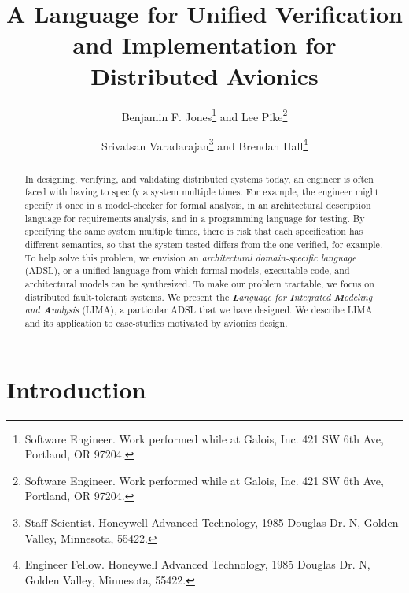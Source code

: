 \documentclass{AIAA}
\newcommand{\lee}[1]{ } %
\newcommand{\lee}[1]{ {\color{blue}$<$lee: #1$>$} } %
\begin{document}
\title{A Language for Unified Verification and Implementation for Distributed Avionics}

\author{Benjamin F. Jones\footnote{Software Engineer. Work performed while at Galois, Inc. 421 SW 6th Ave, Portland, OR 97204.} and Lee Pike\footnote{Software Engineer. Work performed while at Galois, Inc. 421 SW 6th Ave, Portland, OR 97204.}}
\author{Srivatsan Varadarajan\footnote{Staff Scientist. Honeywell Advanced Technology, 1985 Douglas Dr. N, Golden Valley, Minnesota, 55422.} and Brendan Hall\footnote{Engineer Fellow. Honeywell Advanced Technology, 1985 Douglas Dr. N, Golden Valley, Minnesota, 55422.}} 

\begin{abstract}
In designing, verifying, and validating distributed systems today, an engineer is often faced with having to specify a system multiple times. For example, the engineer might specify it once in a model-checker for formal analysis, in an architectural description language for requirements analysis, and in a programming language for testing. By specifying the same system multiple times, there is risk that each specification has different semantics, so that the system tested differs from the one verified, for example. To help solve this problem, we envision an \emph{architectural domain-specific language} (ADSL), or a unified language from which formal models, executable code, and architectural models can be synthesized. To make our problem tractable, we focus on distributed fault-tolerant systems. We present the \emph{\textbf{L}anguage for \textbf{I}ntegrated \textbf{M}odeling and \textbf{A}nalysis} (LIMA), a particular ADSL that we have designed. We describe LIMA and its application to case-studies motivated by avionics design.
\end{abstract}

\maketitle

\lee{%
TODOs:
\begin{itemize}
\item Change pounds to dollars in LIMA examples.
\end{itemize}
}

\section{Introduction}
\label{sec:problem}

\end{document}
